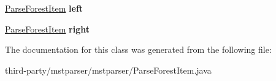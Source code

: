 \begin{DoxyCompactItemize}
\item 
\hypertarget{classmstparser_1_1ParseForestItem_a8d00333bd01a8ef003fe7d9a1ea0c3fb}{
\hyperlink{classmstparser_1_1ParseForestItem}{ParseForestItem} {\bfseries left}}
\label{classmstparser_1_1ParseForestItem_a8d00333bd01a8ef003fe7d9a1ea0c3fb}

\item 
\hypertarget{classmstparser_1_1ParseForestItem_afd62b015b5aa5c93fa2dc9b7d04bf071}{
\hyperlink{classmstparser_1_1ParseForestItem}{ParseForestItem} {\bfseries right}}
\label{classmstparser_1_1ParseForestItem_afd62b015b5aa5c93fa2dc9b7d04bf071}

\end{DoxyCompactItemize}


The documentation for this class was generated from the following file:\begin{DoxyCompactItemize}
\item 
third-\/party/mstparser/mstparser/ParseForestItem.java\end{DoxyCompactItemize}
